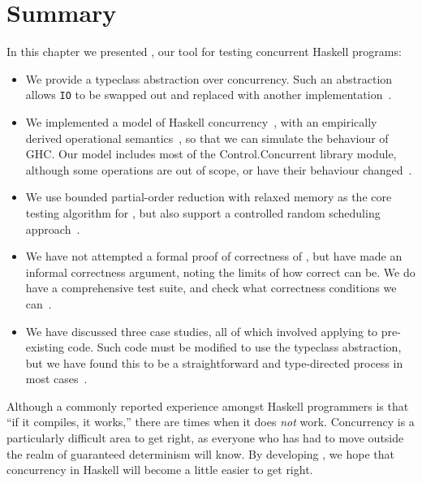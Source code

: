 \vfill\pagebreak
\section{Summary}

In this chapter we presented \dejafu{}, our tool for testing
concurrent Haskell programs:

\begin{itemize}
\item We provide a typeclass abstraction over concurrency.  Such an
  abstraction allows \verb|IO| to be swapped out and replaced with
  another implementation~.

\item We implemented a model of Haskell
  concurrency~, with an empirically derived
  operational semantics~, so that we can
  simulate the behaviour of GHC.  Our model includes most of the
  Control.Concurrent library module, although some operations are out
  of scope, or have their behaviour changed~.

\item We use bounded partial-order reduction \parencite{coons2013} with
  relaxed memory \parencite{zhang2015} as the core testing algorithm for
  \dejafu{}, but also support a controlled random scheduling
  approach~.

\item We have not attempted a formal proof of correctness of
  \dejafu{}, but have made an informal correctness argument, noting
  the limits of how correct \dejafu{} can be.  We do have a
  comprehensive test suite, and check what correctness conditions we
  can~.

\item We have discussed three case studies, all of which involved
  applying \dejafu{} to pre-existing code.  Such code must be modified
  to use the \dejafu{} typeclass abstraction, but we have found this
  to be a straightforward and type-directed process in most
  cases~.
\end{itemize}

Although a commonly reported experience amongst Haskell programmers is
that ``if it compiles, it works,'' there are times when it does
\emph{not} work.  Concurrency is a particularly difficult area to get
right, as everyone who has had to move outside the realm of guaranteed
determinism will know.  By developing \dejafu{}, we hope that
concurrency in Haskell will become a little easier to get right.

